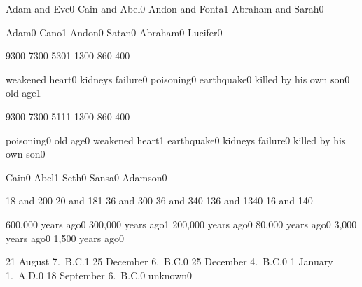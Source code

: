 {Adam and Eve}{0}
{Cain and Abel}{0}
{Andon and Fonta}{1}
{Abraham and Sarah}{0}
\qstop

{Adam}{0}
{Cano}{1}
{Andon}{0}
{Satan}{0}
{Abraham}{0}
{Lucifer}{0}
\qstop

{930}{0}
{730}{0}
{530}{1}
{130}{0}
{86}{0}
{40}{0}
\qstop

{weakened heart}{0}
{kidneys failure}{0}
{poisoning}{0}
{earthquake}{0}
{killed by his own son}{0}
{old age}{1}
\qstop

{930}{0}
{730}{0}
{511}{1}
{130}{0}
{86}{0}
{40}{0}
\qstop

{poisoning}{0}
{old age}{0}
{weakened heart}{1}
{earthquake}{0}
{kidneys failure}{0}
{killed by his own son}{0}
\qstop

{Cain}{0}
{Abel}{1}
{Seth}{0}
{Sansa}{0}
{Adamson}{0}
\qstop

{18 and 20}{0}
{20 and 18}{1}
{36 and 30}{0}
{36 and 34}{0}
{136 and 134}{0}
{16 and 14}{0}
\qstop


{600,000 years ago}{0}
{300,000 years ago}{1}
{200,000 years ago}{0}
{80,000 years ago}{0}
{3,000 years ago}{0}
{1,500 years ago}{0}
\qstop


{21 August 7.~B.C.}{1}
{25 December 6.~B.C.}{0}
{25 December 4.~B.C.}{0}
{1 January 1.~A.D.}{0}
{18 September 6.~B.C.}{0}
{unknown}{0}
\qstop
